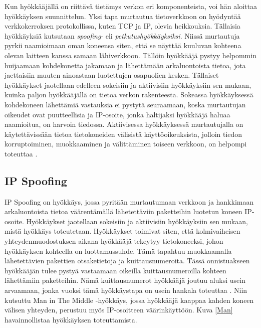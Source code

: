 Kun hyökkääjällä on riittävä tietämys verkon eri komponenteista, voi
hän aloittaa hyökkäyksen suunnittelun. Yksi tapa murtautua
tietoverkkoon on hyödyntää verkkokerroksen protokollissa, kuten TCP ja
IP, olevia heikkouksia. Tällaisia hyökkäyksiä kutsutaan
\textit{spoofing}- eli \textit{petkutushyökkäyksiksi}. Niissä
murtautuja pyrkii naamioimaan oman koneensa siten, että se näyttää
kuuluvan kohteena olevan laitteen kanssa samaan lähiverkkoon.  Tällöin
hyökkääjä pystyy helpommin huijaamaan kohdekonetta jakamaan ja
lähettämään arkaluontoista tietoa, jota jaettaisiin muuten ainoastaan
luotettujen osapuolien kesken.  Tällaiset hyökkäykset jaotellaan
edelleen sokeisiin ja aktiivisiin hyökkäyksiin sen mukaan, kuinka
paljon hyökkääjällä on tietoa verkon rakenteesta. Sokeassa
hyökkäyksessä kohdekoneen lähettämiä vastauksia ei pystytä seuraamaan,
koska murtautujan oikeudet ovat puutteellisia ja IP-osoite, jonka
haltijaksi hyökkääjä haluaa naamioitua, on harvoin tiedossa.
Aktiivisessa hyökkäyksessä murtautujalla on käytettävissään tietoa
tietokoneiden välisistä käyttöoikeuksista, jolloin tiedon
korruptoiminen, muokkaaminen ja välittäminen toiseen verkkoon, on
helpompi toteuttaa \cite{WEBS}.

\subsection{IP Spoofing}

IP Spoofing on hyökkäys, jossa pyritään murtautumaan verkkoon ja
hankkimaan arkaluontoista tietoa väärentämällä lähetettäviin
paketteihin luotetun koneen IP-osoite. Hyökkäykset jaotellaan
sokeisiin ja aktiivisiin hyökkäyksiin sen mukaan, mistä hyökkäys
toteutetaan. Hyökkäykset toimivat siten, että kolmivaiheisen
yhteydenmuodostuksen aikana hyökkääjä tekeytyy tietokoneeksi, johon
hyökkäyksen kohteella on luottamussuhde. Tämä tapahtuu muokkaamalla
lähetettävien pakettien otsaketietoja ja kuittausnumeroita. Tässä
onnistuakseen hyökkääjän tulee pystyä vastaamaan oikeilla
kuittausnumeroilla kohteen lähettämiin paketteihin. Nämä
kuittausnumerot hyökkääjä joutuu aluksi usein arvaamaan, jonka vuoksi
tämä hyökkäystapa on usein hankala toteuttaa \cite{WEBS}. Niin kutsuttu Man
in The Mid\-dle -hyökkäys, jossa hyökkääjä kaappaa kahden koneen välisen
yhteyden, perustuu myös IP-\-osoitteen väärinkäyttöön. Kuva \ref{Man}
havainnollistaa hyökkäyksen toteuttamista.

